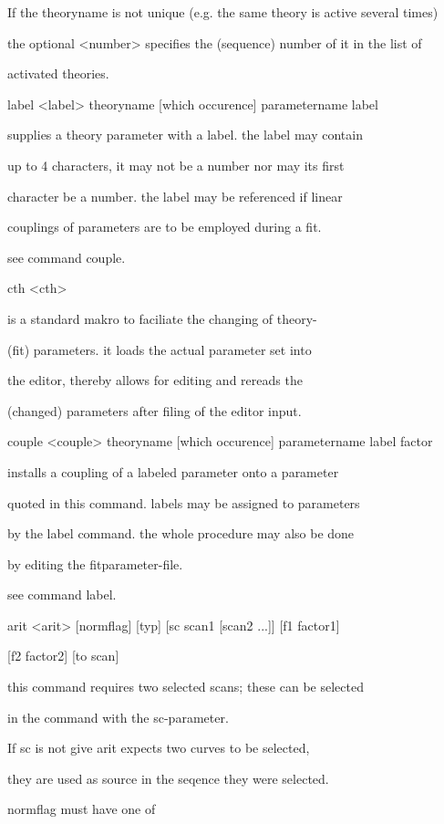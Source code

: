 \documentclass[]{article}
\begin{document}
If the theoryname is not unique (e.g. the same theory is active several
times)

the optional \textless{}number\textgreater{} specifies the (sequence)
number of it in the list of

activated theories.

label \textless{}label\textgreater{} theoryname {[}which occurence{]}
parametername label

supplies a theory parameter with a label. the label may contain

up to 4 characters, it may not be a number nor may its first

character be a number. the label may be referenced if linear

couplings of parameters are to be employed during a fit.

see command couple.

cth \textless{}cth\textgreater{}

is a standard makro to faciliate the changing of theory-

(fit) parameters. it loads the actual parameter set into

the editor, thereby allows for editing and rereads the

(changed) parameters after filing of the editor input.

couple \textless{}couple\textgreater{} theoryname {[}which occurence{]}
parametername label factor

installs a coupling of a labeled parameter onto a parameter

quoted in this command. labels may be assigned to parameters

by the label command. the whole procedure may also be done

by editing the fitparameter-file.

see command label.

arit \textless{}arit\textgreater{} {[}normflag{]} {[}typ{]} {[}sc scan1
{[}scan2 ...{]}{]} {[}f1 factor1{]}

{[}f2 factor2{]} {[}to scan{]}

this command requires two selected scans; these can be selected

in the command with the sc-parameter.

If sc is not give arit expects two curves to be selected,

they are used as source in the seqence they were selected.

normflag must have one of
\end{document}
